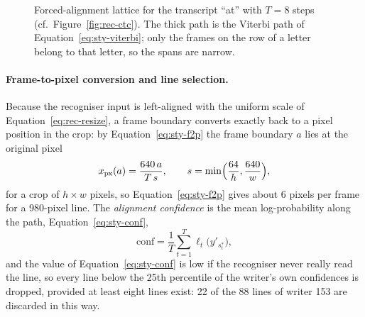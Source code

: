 \begin{figure}[!htbp]
\centering
{}
\caption{Forced-alignment lattice for the transcript ``at'' with $T=8$ steps (cf.\ Figure~\ref{fig:rec-ctc}). The thick path is the Viterbi path of Equation~\ref{eq:sty-viterbi}; only the frames on the row of a letter belong to that letter, so the spans are narrow.}
\label{fig:sty-lattice}
\end{figure}

\paragraph{Frame-to-pixel conversion and line selection.}
Because the recogniser input is left-aligned with the uniform scale of Equation~\ref{eq:rec-resize}, a frame boundary converts exactly back to a pixel position in the crop: by Equation~\ref{eq:sty-f2p} the frame boundary $a$ lies at the original pixel
\begin{equation}
x_{\mathrm{px}}(a)=\frac{640\,a}{T\,s},\qquad s=\min\Bigl(\frac{64}{h},\frac{640}{w}\Bigr),
\label{eq:sty-f2p}
\end{equation}
for a crop of $h\times w$ pixels, so Equation~\ref{eq:sty-f2p} gives about 6 pixels per frame for a 980-pixel line.
The \emph{alignment confidence} is the mean log-probability along the path, Equation~\ref{eq:sty-conf},
\begin{equation}
\mathrm{conf}=\frac1T\sum_{t=1}^{T}\ell_t\bigl(y'_{s^*_t}\bigr),
\label{eq:sty-conf}
\end{equation}
and the value of Equation~\ref{eq:sty-conf} is low if the recogniser never really read the line, so every line below the 25th percentile of the writer's own confidences is dropped, provided at least eight lines exist: 22 of the 88 lines of writer 153 are discarded in this way.

